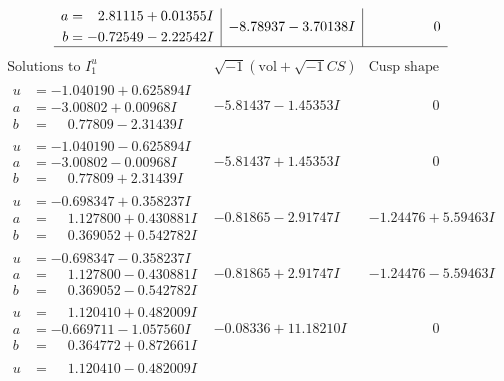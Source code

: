 \documentclass[1p]{elsarticle_modified}
\theoremstyle{definition}
\newcommand{\I}{\sqrt{-1}}
\begin{document}
$$\begin{array}{c|c|c}
\begin{aligned}
a &= \phantom{-}2.81115 + 0.01355 I \\
b &= -0.72549 - 2.22542 I\end{aligned}
 & -8.78937 - 3.70138 I & \phantom{-0.000000 } 0\\
 \hline 
 \end{array}$$\newpage$$\begin{array}{c|c|c}  
\text{Solutions to }I^u_{1}& \I (\text{vol} + \sqrt{-1}CS) & \text{Cusp shape}\\
 \hline 
\begin{aligned}
u &= -1.040190 + 0.625894 I \\
a &= -3.00802 + 0.00968 I \\
b &= \phantom{-}0.77809 - 2.31439 I\end{aligned}
 & -5.81437 - 1.45353 I & \phantom{-0.000000 } 0 \\ \hline\begin{aligned}
u &= -1.040190 - 0.625894 I \\
a &= -3.00802 - 0.00968 I \\
b &= \phantom{-}0.77809 + 2.31439 I\end{aligned}
 & -5.81437 + 1.45353 I & \phantom{-0.000000 } 0 \\ \hline\begin{aligned}
u &= -0.698347 + 0.358237 I \\
a &= \phantom{-}1.127800 + 0.430881 I \\
b &= \phantom{-}0.369052 + 0.542782 I\end{aligned}
 & -0.81865 - 2.91747 I & -1.24476 + 5.59463 I \\ \hline\begin{aligned}
u &= -0.698347 - 0.358237 I \\
a &= \phantom{-}1.127800 - 0.430881 I \\
b &= \phantom{-}0.369052 - 0.542782 I\end{aligned}
 & -0.81865 + 2.91747 I & -1.24476 - 5.59463 I \\ \hline\begin{aligned}
u &= \phantom{-}1.120410 + 0.482009 I \\
a &= -0.669711 - 1.057560 I \\
b &= \phantom{-}0.364772 + 0.872661 I\end{aligned}
 & -0.08336 + 11.18210 I & \phantom{-0.000000 } 0 \\ \hline\begin{aligned}
u &= \phantom{-}1.120410 - 0.482009 I \\

\end{aligned}
\end{array}$$
\end{document}
